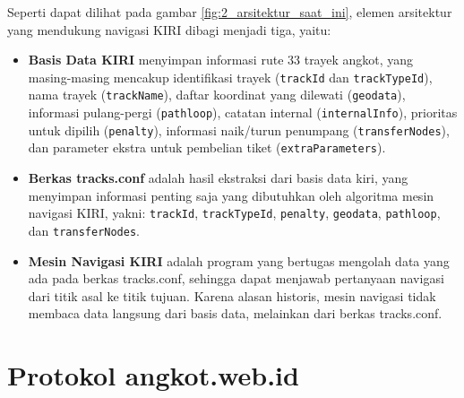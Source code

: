 Seperti dapat dilihat pada gambar \ref{fig:2_arsitektur_saat_ini}, elemen
arsitektur yang mendukung navigasi KIRI dibagi menjadi tiga, yaitu:
\begin{itemize}
	\item \textbf{Basis Data KIRI} menyimpan informasi rute 33 trayek angkot,
		yang masing-masing mencakup identifikasi trayek (\verb/trackId/ dan
		\verb/trackTypeId/), nama trayek (\verb/trackName/), daftar koordinat
		yang dilewati (\verb/geodata/), informasi pulang-pergi
		(\verb/pathloop/), catatan internal (\verb/internalInfo/), prioritas
		untuk dipilih (\verb/penalty/), informasi naik/turun penumpang
		(\verb/transferNodes/), dan parameter ekstra untuk pembelian
		tiket (\verb/extraParameters/).
	\item \textbf{Berkas tracks.conf} adalah hasil ekstraksi dari basis data
		kiri, yang menyimpan informasi penting saja yang dibutuhkan oleh algoritma
		mesin navigasi KIRI, yakni: \verb/trackId/, \verb/trackTypeId/,
		\verb/penalty/, \verb/geodata/, \verb/pathloop/, dan
		\verb/transferNodes/.
	\item \textbf{Mesin Navigasi KIRI} adalah program yang bertugas mengolah
		data yang ada pada berkas tracks.conf, sehingga dapat menjawab
		pertanyaan navigasi dari titik asal ke titik tujuan. Karena alasan
		historis, mesin navigasi tidak membaca data langsung dari basis data,
		melainkan dari berkas tracks.conf.
\end{itemize}

\section{Protokol angkot.web.id}
\label{sec:mesin_navigasi_kiri}

